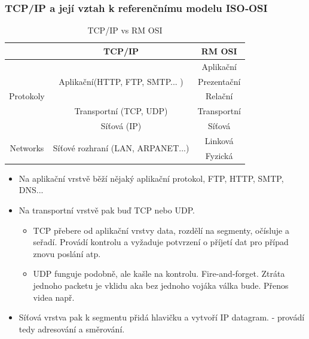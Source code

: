\documentclass[10pt,a4paper]{article}
\begin{document}
\subsubsection{TCP/IP a její vztah k referenčnímu modelu ISO‐OSI}
\begin{table}[ht]
\centering
\begin{tabular}{|c|c|c|}
\hline
                           & TCP/IP                                             & RM OSI      \\
\hline
\multirow{5}{*}{Protokoly} & \multirow{3}{*}{Aplikační(HTTP, FTP, SMTP... )}    & Aplikační   \\
                           &                                                    & Prezentační \\
                           &                                                    & Relační     \\
                           & Transportní (TCP, UDP)                             & Transportní \\
                           & Síťová (IP)                                        & Síťová      \\
\hline
\multirow{2}{*}{Networks}  & \multirow{2}{*}{Síťové rozhraní (LAN, ARPANET...)} & Linková     \\
                           &                                                    & Fyzická    \\
\hline
\end{tabular}
\caption{TCP/IP vs RM OSI}
\label{tab:tcpipvsosi}
\end{table}


\begin{itemize}
\item Na aplikační vrstvě běží nějaký aplikační protokol, FTP, HTTP, SMTP, DNS...
\item Na transportní vrstvě pak buď TCP nebo UDP.
\begin{itemize}
\item TCP přebere od aplikační vrstvy data, rozdělí na segmenty, očísluje a seřadí. Provádí kontrolu a vyžaduje potvrzení o příjetí dat pro případ znovu poslání atp.
\item UDP funguje podobně, ale kašle na kontrolu. Fire-and-forget. Ztráta jednoho packetu je vklidu aka bez jednoho vojáka válka bude. Přenos videa např.
\end{itemize}
\item Síťová vrstva pak k segmentu přidá hlavičku a vytvoří IP datagram. - provádí tedy adresování a směrování.
\end{itemize}
\end{document}
